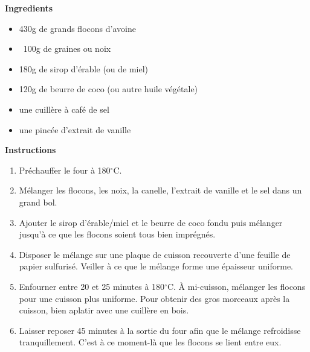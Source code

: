 \documentclass[9pt]{extarticle}
\begin{document}

\begin{center}
    \parbox{0.8\linewidth}{
        \raggedright\itshape

        
    }
\end{center}


{\large \bf Ingredients}

\vspace{.2cm}

\begin{multicols}{2}

    \begin{itemize}[label={},left=0pt,parsep=10pt]
    \item 430g de grands flocons d'avoine
    \item ~100g de graines ou noix
    \item 180g de sirop d'érable (ou de miel)
    \item 120g de beurre de coco (ou autre huile végétale)
    \item une cuillère à café de sel
    \item une pincée d'extrait de vanille
\end{itemize}

\end{multicols}



\vspace{.4cm}

{\large \bf Instructions}

\begin{enumerate}[left=0pt,noitemsep]
    \item Préchauffer le four à 180$^\circ$C.
    \item Mélanger les flocons, les noix, la canelle, l'extrait de vanille et le sel dans un grand bol.
    \item Ajouter le sirop d'érable/miel et le beurre de coco fondu puis mélanger jusqu'à ce que les flocons soient tous bien imprégnés.
    \item Disposer le mélange sur une plaque de cuisson recouverte d'une feuille de papier sulfurisé. Veiller à ce que le mélange forme une épaisseur uniforme.
    \item Enfourner entre 20 et 25 minutes à 180$^\circ$C. À mi-cuisson, mélanger les flocons pour une cuisson plus uniforme. Pour obtenir des gros morceaux après la cuisson, bien aplatir avec une cuillère en bois.
    \item Laisser reposer 45 minutes à la sortie du four afin que le mélange refroidisse tranquillement. C'est à ce moment-là que les flocons se lient entre eux.
\end{enumerate}  \clearpage
\end{document}
